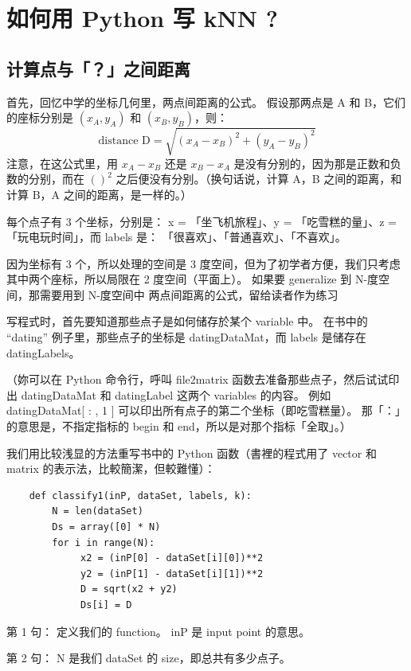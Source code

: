 \documentclass[orivec]{llncs}
\begin{document}
\section{如何用 Python 写 kNN ?}

\subsection{计算点与「？」之间距离}

首先，回忆中学的坐标几何里，两点间距离的公式。  假设那两点是 A 和 B，它们的座标分别是 $(x_A, y_A)$ 和 $(x_B, y_B)$，则：
\begin{equation}
\mbox{distance D} = \sqrt{ (x_A - x_B)^2 + (y_A - y_B)^2 }
\end{equation}
注意，在这公式里，用 $x_A - x_B$ 还是 $x_B - x_A$ 是没有分别的，因为那是正数和负数的分别，而在 $()^2$ 之后便没有分别。（换句话说，计算 A，B 之间的距离，和计算 B，A 之间的距离，是一样的。）

每个点子有 3 个坐标，分别是： x = 「坐飞机旅程」、y = 「吃雪糕的量」、z = 「玩电玩时间」，而 labels 是： 「很喜欢」、「普通喜欢」、「不喜欢」。

因为坐标有 3 个，所以处理的空间是 3 度空间，但为了初学者方便，我们只考虑其中两个座标，所以局限在 2 度空间（平面上）。   如果要 generalize 到 N-度空间，那需要用到 N-度空间中 两点间距离的公式，留给读者作为练习 {\Large \smiley}

写程式时，首先要知道那些点子是如何储存於某个 variable 中。  在书中的 ``dating'' 例子里，那些点子的坐标是 datingDataMat，而 labels 是储存在 datingLabels。

（妳可以在 Python 命令行，呼叫 file2matrix 函数去准备那些点子，然后试试印出 datingDataMat 和 datingLabel 这两个 variables 的内容。 例如 datingDataMat[ : , 1 ] 可以印出所有点子的第二个坐标（即吃雪糕量）。 那「：」的意思是，不指定指标的 begin 和 end，所以是对那个指标「全取」。）

我们用比较浅显的方法重写书中的 Python 函数（書裡的程式用了 vector 和 matrix 的表示法，比較簡潔，但較難懂）：
\begin{verbatim}
    def classify1(inP, dataSet, labels, k):
        N = len(dataSet)
        Ds = array([0] * N)
        for i in range(N):
             x2 = (inP[0] - dataSet[i][0])**2
             y2 = (inP[1] - dataSet[i][1])**2
             D = sqrt(x2 + y2)
             Ds[i] = D
\end{verbatim}

第 1 句： 定义我们的 function。  inP 是 input point 的意思。

第 2 句： N 是我们 dataSet 的 size，即总共有多少点子。
\end{document}
